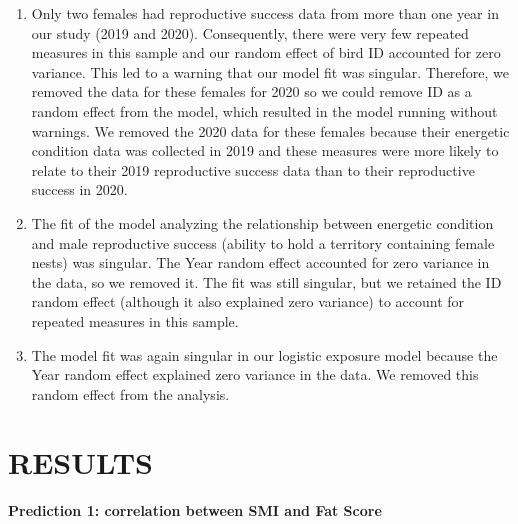 \documentclass[
]{article}
\begin{document}
\begin{enumerate}
\def\labelenumi{\arabic{enumi})}
\setcounter{enumi}{5}
\item
  Only two females had reproductive success data from more than one year
  in our study (2019 and 2020). Consequently, there were very few
  repeated measures in this sample and our random effect of bird ID
  accounted for zero variance. This led to a warning that our model fit
  was singular. Therefore, we removed the data for these females for
  2020 so we could remove ID as a random effect from the model, which
  resulted in the model running without warnings. We removed the 2020
  data for these females because their energetic condition data was
  collected in 2019 and these measures were more likely to relate to
  their 2019 reproductive success data than to their reproductive
  success in 2020.
\item
  The fit of the model analyzing the relationship between energetic
  condition and male reproductive success (ability to hold a territory
  containing female nests) was singular. The Year random effect
  accounted for zero variance in the data, so we removed it. The fit was
  still singular, but we retained the ID random effect (although it also
  explained zero variance) to account for repeated measures in this
  sample.
\item
  The model fit was again singular in our logistic exposure model
  because the Year random effect explained zero variance in the data. We
  removed this random effect from the analysis.
\end{enumerate}

\pagebreak

\hypertarget{results}{%
\section{RESULTS}\label{results}}

\textbf{Prediction 1: correlation between SMI and Fat Score}
\end{document}
